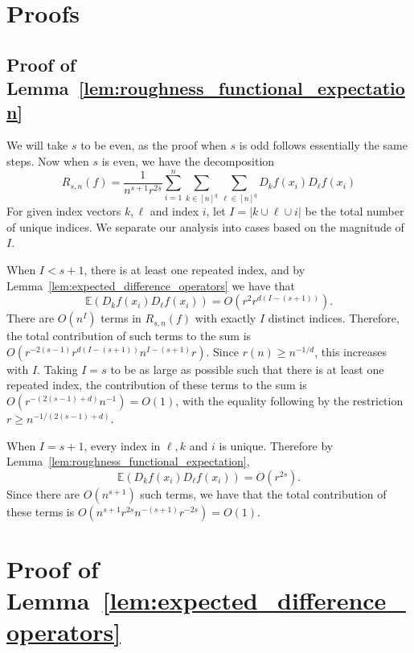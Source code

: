 \documentclass{article}
\newcommand{\abs}[1]{\left \lvert #1 \right \rvert}
\newcommand{\1}{\mathbf{1}}
\newcommand{\Ebb}{\mathbb{E}}
\theoremstyle{alden}
\theoremstyle{aldenthm}
\theoremstyle{definition}
\theoremstyle{remark}
\begin{document}
\section{Proofs}

\subsection{Proof of Lemma~\ref{lem:roughness_functional_expectation}}
We will take $s$ to be even, as the proof when $s$ is odd follows essentially the same steps. Now when $s$ is even, we have the decomposition
\begin{equation*}
R_{s,n}(f) = \frac{1}{n^{s+1}r^{2s}} \sum_{i = 1}^{n} \sum_{k \in [n]^q} \sum_{\ell \in [n]^q} D_kf(x_i) D_{\ell}f(x_i)
\end{equation*}
For given index vectors $k,\ell$ and index $i$, let $I = \abs{k \cup \ell \cup i}$ be the total number of unique indices. We separate our analysis into cases based on the magnitude of $I$. 

When $I < s + 1$, there is at least one repeated index, and by Lemma~\ref{lem:expected_difference_operators} we have that
\begin{equation*}
\Ebb(D_kf(x_i)D_{\ell}f(x_i)) = O(r^2r^{d(I - (s + 1))}).
\end{equation*}
There are $O(n^{I})$ terms in $R_{s,n}(f)$ with exactly $I$ distinct indices. Therefore, the total contribution of such terms to the sum is $O(r^{-2(s - 1)}r^{d(I - (s + 1))}n^{I - (s + 1)}r)$. Since $r(n) \geq n^{-1/d}$, this increases with $I$. Taking $I = s$ to be as large as possible such that there is at least one repeated index, the contribution of these terms to the sum is $O(r^{-(2(s - 1) + d)}n^{-1}) = O(1)$, with the equality following by the restriction $r \geq n^{-1/(2(s - 1) + d)}$. 

When $I = s + 1$, every index in $\ell,k$ and $i$ is unique. Therefore by Lemma~\ref{lem:roughness_functional_expectation},  
\begin{equation*}
\Ebb(D_kf(x_i)D_{\ell}f(x_i)) = O(r^{2s}).
\end{equation*}
Since there are $O(n^{s+1})$ such terms, we have that the total contribution of these terms is $O(n^{s + 1}r^{2s}n^{-(s + 1)}r^{-2s}) = O(1)$.

\section{Proof of Lemma~\ref{lem:expected_difference_operators}}
\end{document}
